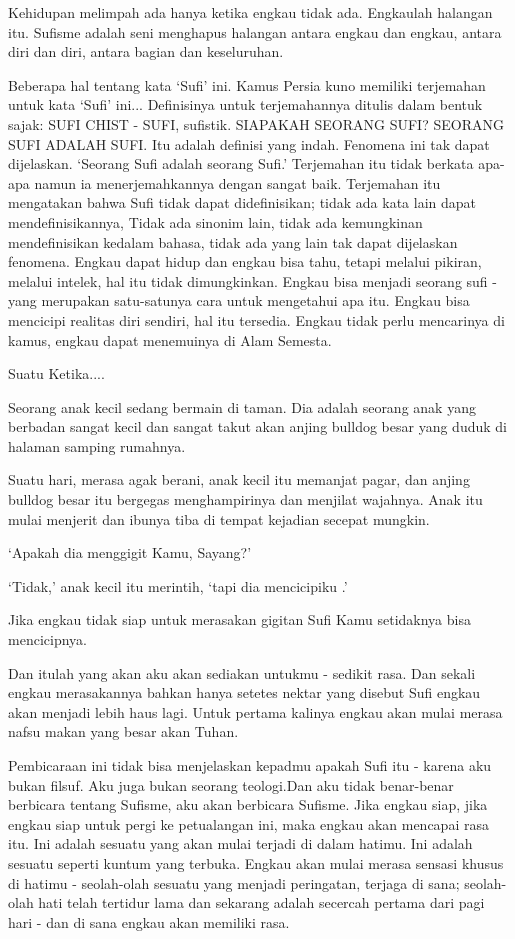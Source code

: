 Kehidupan melimpah ada hanya ketika engkau tidak ada. Engkaulah halangan itu. Sufisme adalah seni menghapus halangan antara engkau dan engkau, antara diri dan diri, antara bagian dan keseluruhan.

Beberapa hal tentang kata ‘Sufi’ ini. Kamus Persia kuno memiliki terjemahan untuk kata ‘Sufi’ ini... Definisinya untuk terjemahannya ditulis dalam bentuk sajak: SUFI CHIST - SUFI, sufistik. SIAPAKAH SEORANG SUFI? SEORANG SUFI ADALAH SUFI. Itu adalah definisi yang indah. Fenomena ini tak dapat dijelaskan. ‘Seorang Sufi adalah seorang Sufi.’  Terjemahan itu tidak berkata apa-apa namun ia menerjemahkannya dengan sangat baik. Terjemahan itu mengatakan bahwa Sufi tidak dapat didefinisikan; tidak ada kata lain dapat mendefinisikannya, Tidak ada sinonim lain, tidak ada kemungkinan mendefinisikan kedalam bahasa, tidak ada yang lain tak dapat dijelaskan fenomena. Engkau dapat hidup dan engkau bisa tahu, tetapi melalui pikiran, melalui intelek, hal itu tidak dimungkinkan. Engkau bisa menjadi seorang sufi - yang merupakan satu-satunya cara untuk mengetahui apa itu. Engkau bisa mencicipi realitas diri sendiri, hal itu tersedia. Engkau tidak perlu mencarinya di kamus, engkau dapat menemuinya di Alam Semesta.

Suatu Ketika....

Seorang anak kecil sedang bermain di taman. Dia adalah seorang anak yang berbadan sangat kecil dan sangat takut akan anjing bulldog besar yang duduk di halaman samping rumahnya.

Suatu hari, merasa agak berani, anak kecil itu memanjat pagar, dan anjing bulldog besar itu bergegas menghampirinya dan menjilat wajahnya. Anak itu mulai menjerit dan ibunya tiba di tempat kejadian secepat mungkin.

‘Apakah dia menggigit Kamu, Sayang?’

‘Tidak,’ anak kecil itu merintih, ‘tapi dia mencicipiku .’

Jika engkau tidak siap untuk merasakan gigitan Sufi Kamu setidaknya bisa mencicipnya.

Dan itulah yang akan aku akan sediakan untukmu - sedikit rasa. Dan sekali engkau merasakannya bahkan hanya setetes nektar yang disebut Sufi engkau akan menjadi lebih haus lagi. Untuk pertama kalinya engkau akan mulai merasa nafsu makan yang besar akan Tuhan.

Pembicaraan ini tidak bisa menjelaskan kepadmu apakah Sufi itu - karena aku bukan filsuf. Aku juga bukan seorang teologi.Dan aku tidak benar-benar berbicara tentang Sufisme, aku akan berbicara Sufisme. Jika engkau siap, jika engkau siap untuk pergi ke petualangan ini, maka engkau akan mencapai rasa itu. Ini adalah sesuatu yang akan mulai terjadi di dalam hatimu. Ini adalah sesuatu seperti kuntum yang terbuka. Engkau akan mulai merasa sensasi khusus di hatimu - seolah-olah sesuatu yang menjadi peringatan, terjaga di sana; seolah-olah hati telah tertidur lama dan sekarang adalah secercah pertama dari pagi hari - dan di sana engkau akan memiliki rasa.


